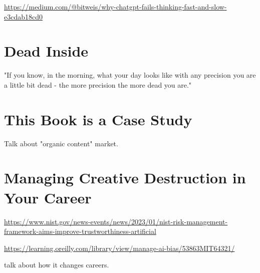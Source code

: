 \url{https://medium.com/@bitweis/why-chatgpt-fails-thinking-fast-and-slow-e3cdab18cd0}

\section{Dead Inside}

"If you know, in the morning, what your day looks like with any precision you are a little bit dead - the more precision the more dead you are."

\section{This Book is a Case Study}

Talk about "organic content" market.

\section{Managing Creative Destruction in Your Career}

\url{https://www.nist.gov/news-events/news/2023/01/nist-risk-management-framework-aims-improve-trustworthiness-artificial}

\url{https://learning.oreilly.com/library/view/manage-ai-bias/53863MIT64321/}

talk about how it changes careers.
